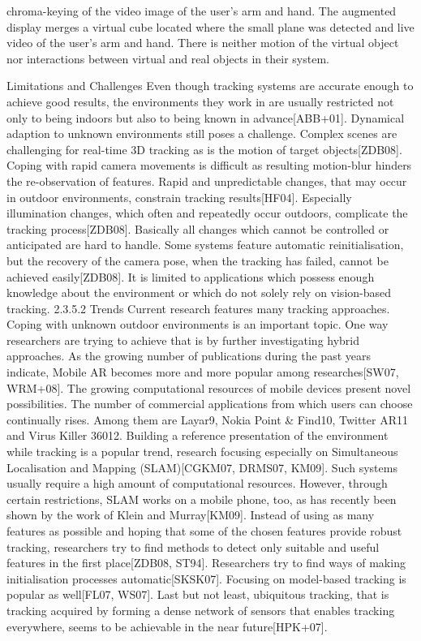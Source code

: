 chroma-keying of the video image of the user’s arm and hand. The augmented display merges a virtual cube located where the small plane was detected and live video of the user’s arm and hand. There is neither motion of the virtual object nor interactions between virtual and real objects in their system.



Limitations and Challenges 
Even though tracking systems are accurate enough to achieve good results, the environments they work in are usually restricted not only to being indoors but also to being known in advance[ABB+01]. Dynamical adaption to unknown environments still poses a challenge. Complex scenes are challenging for real-time 3D tracking as is the motion of target objects[ZDB08]. Coping with rapid camera movements is difficult as resulting motion-blur hinders the re-observation of features. Rapid and unpredictable changes, that may occur in outdoor environments, constrain tracking results[HF04]. Especially illumination changes, which often and repeatedly occur outdoors, complicate the tracking process[ZDB08]. Basically all changes which cannot be controlled or anticipated are hard to handle. Some systems feature automatic reinitialisation, but the recovery of the camera pose, when the tracking has failed, cannot be achieved easily[ZDB08]. It is limited to applications which possess enough knowledge about the environment or which do not solely rely on vision-based tracking. 2.3.5.2 Trends Current research features many tracking approaches. Coping with unknown outdoor environments is an important topic. One way researchers are trying to achieve that is by further investigating hybrid approaches. As the growing number of publications during the past years indicate, Mobile AR becomes more and more popular among researches[SW07, WRM+08]. The growing computational resources of mobile devices present novel possibilities. The number of commercial applications from which users can choose continually rises. Among them are Layar9, Nokia Point \& Find10, Twitter AR11 and Virus Killer 36012. Building a reference presentation of the environment while tracking is a popular trend, research focusing especially on Simultaneous Localisation and Mapping (SLAM)[CGKM07, DRMS07, KM09]. Such systems usually require a high amount of computational resources. However, through certain restrictions, SLAM works on a mobile phone, too, as has recently been shown by the work of Klein and Murray[KM09]. Instead of using as many features as possible and hoping that some of the chosen features provide robust tracking, researchers try to find methods to detect only suitable and useful features in the first place[ZDB08, ST94]. Researchers try to find ways of making initialisation processes automatic[SKSK07]. Focusing on model-based tracking is popular as well[FL07, WS07]. Last but not least, ubiquitous tracking, that is tracking acquired by forming a dense network of sensors that enables tracking everywhere, seems to be achievable in the near future[HPK+07].


